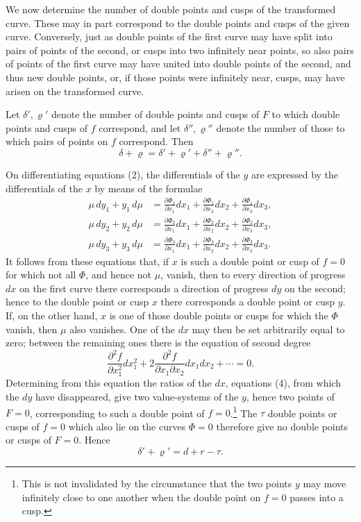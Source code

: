 \documentclass[10pt]{article}
\begin{document}
We now determine the number of double points and cusps of the transformed curve. These may in part correspond to the double points and cusps of the given curve. Conversely, just as double points of the first curve may have split into pairs of points of the second, or cusps into two infinitely near points, so also pairs of points of the first curve may have united into double points of the second, and thus new double points, or, if those points were infinitely near, cusps, may have arisen on the transformed curve.

Let \(\delta',\varrho'\) denote the number of double points and cusps of \(F\) to which double points and cusps of \(f\) correspond, and let \(\delta'',\varrho''\) denote the number of those to which pairs of points on \(f\) correspond. Then
\[
\delta+\varrho=\delta'+\varrho'+\delta''+\varrho''.
\]

On differentiating equations (2), the differentials of the \(y\) are expressed by the differentials of the \(x\) by means of the formulae
\[
\tag{4}
\begin{aligned}
\mu\,dy_1+y_1\,d\mu
&=\frac{\partial\Phi_1}{\partial x_1}dx_1+
  \frac{\partial\Phi_1}{\partial x_2}dx_2+
  \frac{\partial\Phi_1}{\partial x_3}dx_3,\\
\mu\,dy_2+y_2\,d\mu
&=\frac{\partial\Phi_2}{\partial x_1}dx_1+
  \frac{\partial\Phi_2}{\partial x_2}dx_2+
  \frac{\partial\Phi_2}{\partial x_3}dx_3,\\
\mu\,dy_3+y_3\,d\mu
&=\frac{\partial\Phi_3}{\partial x_1}dx_1+
  \frac{\partial\Phi_3}{\partial x_2}dx_2+
  \frac{\partial\Phi_3}{\partial x_3}dx_3.
\end{aligned}
\]
It follows from these equations that, if \(x\) is such a double point or cusp of \(f=0\) for which not all \(\Phi\), and hence not \(\mu\), vanish, then to every direction of progress \(dx\) on the first curve there corresponds a direction of progress \(dy\) on the second; hence to the double point or cusp \(x\) there corresponds a double point or cusp \(y\). If, on the other hand, \(x\) is one of those double points or cusps for which the \(\Phi\) vanish, then \(\mu\) also vanishes. One of the \(dx\) may then be set arbitrarily equal to zero; between the remaining ones there is the equation of second degree
\[
\frac{\partial^2 f}{\partial x_1^2}dx_1^2
+2\frac{\partial^2 f}{\partial x_1\partial x_2}dx_1dx_2+\cdots=0.
\]
Determining from this equation the ratios of the \(dx\), equations (4), from which the \(dy\) have disappeared, give two value-systems of the \(y\), hence two points of \(F=0\), corresponding to such a double point of \(f=0\).\footnote{This is not invalidated by the circumstance that the two points \(y\) may move infinitely close to one another when the double point on \(f=0\) passes into a cusp.} The \(\tau\) double points or cusps of \(f=0\) which also lie on the curves \(\Phi=0\) therefore give no double points or cusps of \(F=0\). Hence
\[
\delta'+\varrho'=d+r-\tau.
\]
\end{document}
